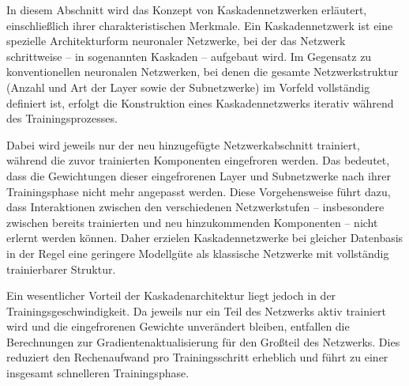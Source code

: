 In diesem Abschnitt wird das Konzept von Kaskadennetzwerken erläutert, einschließlich ihrer charakteristischen Merkmale. Ein Kaskadennetzwerk ist 
eine spezielle Architekturform neuronaler Netzwerke, bei der das Netzwerk schrittweise – in sogenannten Kaskaden – aufgebaut wird. Im Gegensatz zu 
konventionellen neuronalen Netzwerken, bei denen die gesamte Netzwerkstruktur (Anzahl und Art der Layer sowie der Subnetzwerke) im Vorfeld 
vollständig definiert ist, erfolgt die Konstruktion eines Kaskadennetzwerks iterativ während des Trainingsprozesses.

Dabei wird jeweils nur der neu hinzugefügte Netzwerkabschnitt trainiert, während die zuvor trainierten Komponenten eingefroren werden. 
Das bedeutet, dass die Gewichtungen dieser eingefrorenen Layer und Subnetzwerke nach ihrer Trainingsphase nicht mehr angepasst werden. Diese 
Vorgehensweise führt dazu, dass Interaktionen zwischen den verschiedenen Netzwerkstufen – insbesondere zwischen bereits trainierten und neu 
hinzukommenden Komponenten – nicht erlernt werden können. Daher erzielen Kaskadennetzwerke bei gleicher Datenbasis in der Regel eine 
geringere Modellgüte als klassische Netzwerke mit vollständig trainierbarer Struktur.

Ein wesentlicher Vorteil der Kaskadenarchitektur liegt jedoch in der Trainingsgeschwindigkeit. Da jeweils nur ein Teil des Netzwerks aktiv 
trainiert wird und die eingefrorenen Gewichte unverändert bleiben, entfallen die Berechnungen zur Gradientenaktualisierung für den Großteil des 
Netzwerks. Dies reduziert den Rechenaufwand pro Trainingsschritt erheblich und führt zu einer insgesamt schnelleren Trainingsphase.
